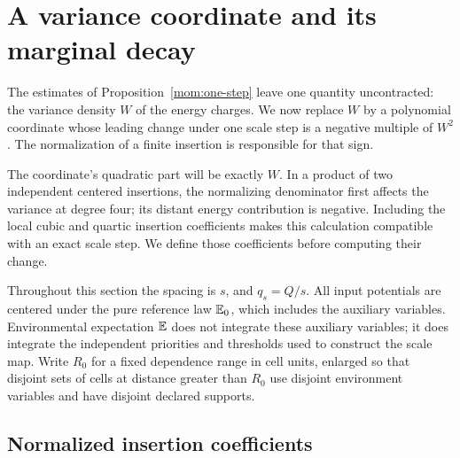 \section{A variance coordinate and its marginal decay}
\label{sec:variance}

The estimates of Proposition~\ref{mom:one-step} leave one quantity
uncontracted: the variance density $W$ of the energy charges.  We now
replace $W$ by a polynomial coordinate whose leading change under one
scale step is a negative multiple of $W^2$.  The normalization of a finite insertion
is responsible for that sign.

The coordinate's quadratic part will be exactly $W$.  In a product of
two independent centered insertions, the normalizing denominator first
affects the variance at degree four; its distant energy contribution
is negative.  Including the local cubic and quartic insertion
coefficients makes this calculation compatible with an exact scale
step.  We define those coefficients before computing their change.

Throughout this section the spacing is $s$, and $q_s=Q/s$.  All input
potentials are centered under the pure reference law $\mathbb E_0$, which
includes the auxiliary variables.  Environmental expectation $\mathbb E$ does
not integrate these auxiliary variables; it does integrate the independent
priorities and thresholds used to construct the scale map.  Write $R_0$
for a fixed dependence range in cell units, enlarged so that disjoint
sets of cells at distance greater than $R_0$ use disjoint environment
variables and have disjoint declared supports.

\subsection{Normalized insertion coefficients}

